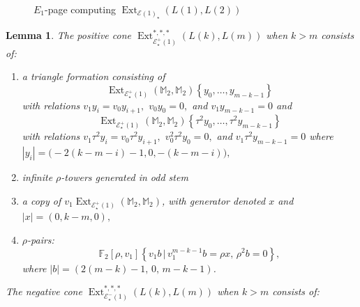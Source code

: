 \documentclass[10pt,a4paper]{amsart}
\newtheorem{lemma}{Lemma}
\DeclareMathOperator{\Ext}{Ext}
\newcommand{\cE}{{\mathcal E}}
\newcommand{\mF}{{\mathbb F}}
\newcommand{\mM}{{\mathbb M}}
\begin{document}
\begin{figure}[ht]

\caption{$E_1$-page computing $\Ext_{\cE(1)_\star}(L(1), L(2))$}
\label{fig:E1ExtL1L2}
\end{figure}

\begin{lemma}\label{lem:k>m}
The positive cone $\Ext_{\cE^{+}_\star(1)}^{*,*,*}(L(k), L(m))$ when $k > m$ consists of: 
\begin{enumerate}
\item a triangle formation consisting of \label{classes:positive triangle}
\[
\Ext_{\cE^{+}_{\star}(1)}\left(\mM_{2}, \mM_{2}\right) \left\{y_{0}, \ldots, y_{m-k-1} \right\}
\]
with relations $v_{1}y_{i} = v_{0}y_{i+1},$ $v_{0}y_{0} = 0,$ and $v_{1}y_{m-k-1} = 0$ and 
\[
\Ext_{\cE^{+}_{\star}(1)}\left(\mM_{2}, \mM_{2}\right) \left\{ \tau^{2}y_{0}, \ldots, \tau^{2}y_{m-k-1} \right\}
\]
with relations $v_{1} \tau^{2}y_{i} = v_{0}\tau^{2}y_{i+1},$ $v_{0}^{2}\tau^{2}y_{0} = 0,$ and $v_{1}\tau^2 y_{m-k-1} = 0$ where \newline $|y_{i}| = \big(-2(k-m - i)-1, 0, -(k-m - i)\big),$ 

     \item infinite $\rho$-towers generated in odd stem

      \item a copy of $v_{1}\Ext_{\cE^{+}_{\star}(1)}(\mM_{2}, \mM_{2})$, with generator denoted $x$ and $|x| = (0, k-m, 0),$\label{component 3 of pos cone}

    \item $\rho$-pairs: \[\mF_{2}[\rho, v_{1}] \left\{ v_1 b \, | \, v_{1}^{m-k-1}b = \rho x, \, \rho^{2}b = 0\right\}, \] where $|b| = (2(m-k)-1, \, 0, \, m-k-1)$. 
    \end{enumerate}

    The negative cone $\Ext_{\cE^{-}_\star(1)}^{*,*,*}(L(k), L(m))$ when $k > m$ consists of:



\end{lemma}
\end{document}
